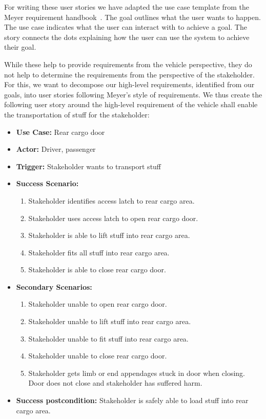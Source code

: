 
For writing these user stories we have adapted the use case template from the Meyer requirement handbook~\cite{meyer2022handbook}. The goal outlines what the user wants to happen. The use case indicates what the user can interact with to achieve a goal. The story connects the dots explaining how the user can use the system to achieve their goal.

While these help to provide requirements from the vehicle perspective, they do not help to determine the requirements from the perspective of the stakeholder. For this, we want to decompose our high-level requirements, identified from our goals, into user stories following Meyer's style of requirements. We thus create the following user story around the high-level requirement of the vehicle shall enable the transportation of stuff for the stakeholder:
\begin{itemize}
	\item \textbf{Use Case:} Rear cargo door
	\item \textbf{Actor:} Driver, passenger
	\item \textbf{Trigger:} Stakeholder wants to transport stuff
	\item \textbf{Success Scenario:}
	\begin{enumerate}
		\item Stakeholder identifies access latch to rear cargo area.
		\item Stakeholder uses access latch to open rear cargo door.
		\item Stakeholder is able to lift stuff into rear cargo area.
		\item Stakeholder fits all stuff into rear cargo area.
		\item Stakeholder is able to close rear cargo door.
	\end{enumerate}
	\item \textbf{Secondary Scenarios:}
	\begin{enumerate}
		\item Stakeholder unable to open rear cargo door.
		\item Stakeholder unable to lift stuff into rear cargo area.
		\item Stakeholder unable to fit stuff into rear cargo area.
		\item Stakeholder unable to close rear cargo door.
		\item Stakeholder gets limb or end appendages stuck in door when closing. Door does not close and stakeholder has suffered harm.
	\end{enumerate}
	\item \textbf{Success postcondition:} Stakeholder is safely able to load stuff into rear cargo area.
\end{itemize}

